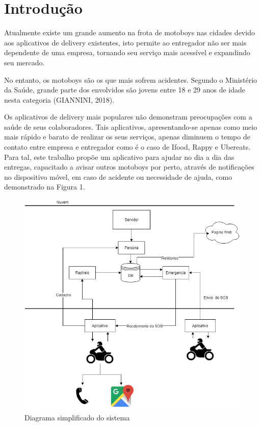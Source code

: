 
\chapter{Introdução} \label{cap:intro} 

Atualmente existe um grande aumento na frota de motoboys nas cidades devido aos aplicativos de delivery existentes, isto permite ao entregador não ser mais dependente de uma empresa, tornando seu serviço mais acessível e expandindo seu mercado. 

No entanto, os motoboys são os que mais sofrem acidentes. Segundo o Ministério da Saúde, grande parte dos envolvidos são jovens entre 18 e 29 anos de idade nesta categoria (GIANNINI, 2018).

Os aplicativos de delivery mais populares não demonstram preocupações com a saúde de seus colaboradores. Tais aplicativos, apresentando-se apenas como meio mais rápido e barato de realizar os seus serviços, apenas diminuem o tempo de contato entre empresa e entregador como é o caso de Ifood, Rappy e Ubereats. Para tal, este trabalho propõe um aplicativo para ajudar no dia a dia das entregas, capacitado a avisar outros motoboys por perto, através de notificações no dispositivo móvel, em caso de acidente ou necessidade de ajuda, como demonstrado na Figura 1.



\begin{figure}[H]

 \caption{Diagrama simplificado do sistema }
  \includegraphics[width=\textwidth]{images/Cap1/tcc.png}
  
  
\end{figure}




